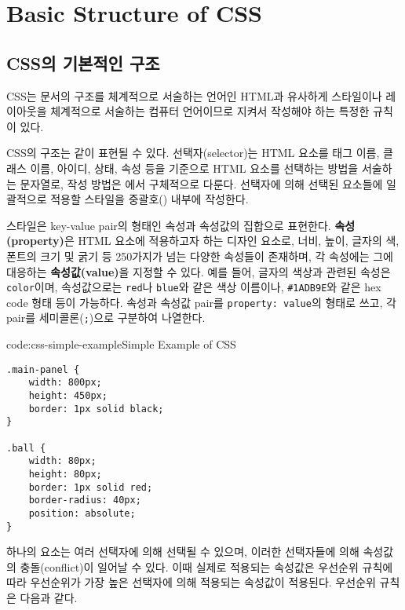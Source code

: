 \section{Basic Structure of CSS} \label{sect:basic-structure-of-css}

\subsection*{CSS의 기본적인 구조}

CSS는 문서의 구조를 체계적으로 서술하는 언어인 HTML과 유사하게 스타일이나 레이아웃을 체계적으로 서술하는 컴퓨터 언어이므로 지켜서 작성해야 하는 특정한 규칙이 있다.

    {}

CSS의 구조는 \와 같이 표현될 수 있다. 선택자(selector)는 HTML 요소를 태그 이름, 클래스 이름, 아이디, 상태, 속성 등을 기준으로 HTML 요소를 선택하는 방법을 서술하는 문자열로, 작성 방법은 에서 구체적으로 다룬다. 선택자에 의해 선택된 요소들에 일괄적으로 적용할 스타일을 중괄호(\texttt{{}}) 내부에 작성한다.

스타일은 key-value pair의 형태인 속성과 속성값의 집합으로 표현한다. \textbf{속성(property)}은 HTML 요소에 적용하고자 하는 디자인 요소로, 너비, 높이, 글자의 색, 폰트의 크기 및 굵기 등 250가지가 넘는 다양한 속성들이 존재하며, 각 속성에는 그에 대응하는 \textbf{속성값(value)}을 지정할 수 있다. 예를 들어, 글자의 색상과 관련된 속성은 \texttt{color}이며, 속성값으로는 \texttt{red}나 \texttt{blue}와 같은 색상 이름이나, \texttt{\#1ADB9E}와 같은 hex code 형태 등이 가능하다. 속성과 속성값 pair를 \verb|property: value|의 형태로 쓰고, 각 pair를 세미콜론(\texttt{;})으로 구분하여 나열한다.

\begin{codeenv}{code:css-simple-example}{Simple Example of CSS}\begin{verbatim}
.main-panel {
    width: 800px;
    height: 450px;
    border: 1px solid black;
}

.ball {
    width: 80px;
    height: 80px;
    border: 1px solid red;
    border-radius: 40px;
    position: absolute;
}
\end{verbatim}
\end{codeenv}

하나의 요소는 여러 선택자에 의해 선택될 수 있으며, 이러한 선택자들에 의해 속성값의 충돌(conflict)이 일어날 수 있다. 이때 실제로 적용되는 속성값은 우선순위 규칙에 따라 우선순위가 가장 높은 선택자에 의해 적용되는 속성값이 적용된다. 우선순위 규칙은 다음과 같다.

